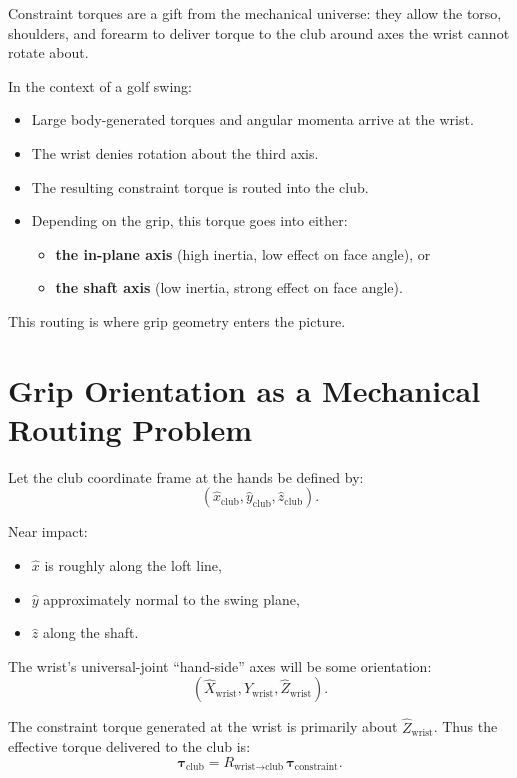 \documentclass[11pt]{article}
\begin{document}
Constraint torques are a gift from the mechanical universe:  
they allow the torso, shoulders, and forearm to deliver torque to the club around axes the wrist cannot rotate about.  

In the context of a golf swing:
\begin{itemize}
    \item Large body-generated torques and angular momenta arrive at the wrist.
    \item The wrist denies rotation about the third axis.
    \item The resulting constraint torque is routed into the club.
    \item Depending on the grip, this torque goes into either:
    \begin{itemize}
        \item \textbf{the in-plane axis} (high inertia, low effect on face angle), or
        \item \textbf{the shaft axis} (low inertia, strong effect on face angle).
    \end{itemize}
\end{itemize}

This routing is where grip geometry enters the picture.

\section{Grip Orientation as a Mechanical Routing Problem}

Let the club coordinate frame at the hands be defined by:
\[
(\hat{x}_{\text{club}}, \hat{y}_{\text{club}}, \hat{z}_{\text{club}}).
\]

Near impact:
\begin{itemize}
    \item $\hat{x}$ is roughly along the loft line,
    \item $\hat{y}$ approximately normal to the swing plane,
    \item $\hat{z}$ along the shaft.
\end{itemize}

The wrist's universal-joint “hand-side” axes will be some orientation:
\[
(\hat{X}_{\text{wrist}}, \hat{Y}_{\text{wrist}}, \hat{Z}_{\text{wrist}}).
\]

The constraint torque generated at the wrist is primarily about $\hat{Z}_{\text{wrist}}$.
Thus the effective torque delivered to the club is:
\[
\bm{\tau}_{\text{club}} = R_{\text{wrist}\to\text{club}} \, \bm{\tau}_{\text{constraint}}.
\]
\end{document}
